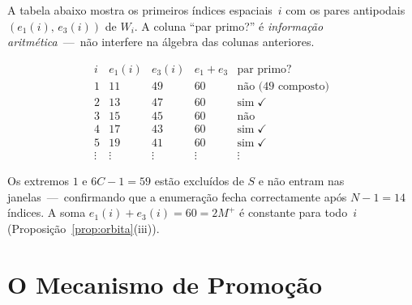 \documentclass[12pt, a4paper]{article}
\theoremstyle{plain}
\theoremstyle{definition}
\theoremstyle{remark}
\begin{document}
	A tabela abaixo mostra os primeiros índices espaciais~$i$ com os
	pares antipodais $(e_1(i),\,e_3(i))$ de $W_i$.
	A coluna ``par primo?'' é \emph{informação aritmética}~---~não
	interfere na álgebra das colunas anteriores.
	
	\[
	\begin{array}{c|cc|c|c}
		i & e_1(i) & e_3(i) & e_1+e_3 & \text{par primo?}\\
		\hline
		1 & 11 & 49 & 60 & \text{não (49 composto)}\\
		2 & 13 & 47 & 60 & \text{sim}\;\checkmark\\
		3 & 15 & 45 & 60 & \text{não}\\
		4 & 17 & 43 & 60 & \text{sim}\;\checkmark\\
		5 & 19 & 41 & 60 & \text{sim}\;\checkmark\\
		\vdots & \vdots & \vdots & \vdots & \vdots
	\end{array}
	\]
	
	Os extremos $1$ e $6C-1=59$ estão excluídos de $S$ e não entram nas
	janelas~---~confirmando que a enumeração fecha correctamente após
	$N-1=14$ índices.  A soma $e_1(i)+e_3(i)=60=2M^+$ é
	constante para todo~$i$ (Proposição~\ref{prop:orbita}(iii)).
	
	\section{O Mecanismo de Promoção}
	\label{sec:promocao}
	
\end{document}
